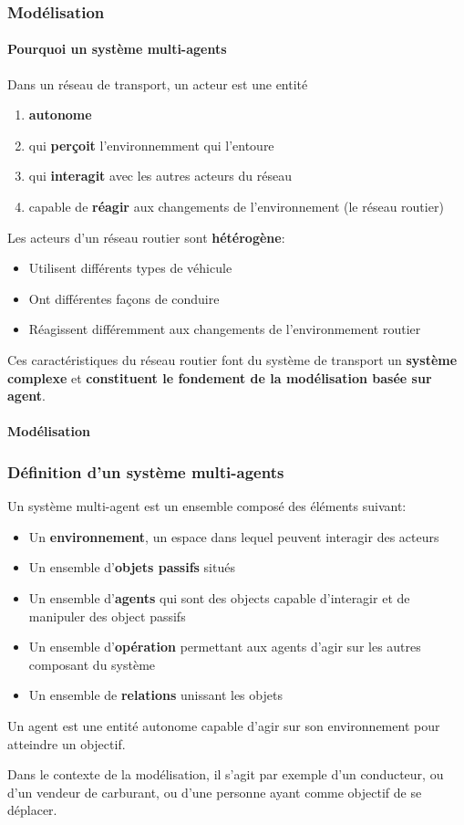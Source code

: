 \begin{frame}
    \frametitle{Modélisation}
    \framesubtitle{Pourquoi un système multi-agents}

    Dans un réseau de transport, un acteur est une entité
    \begin{enumerate}
        \item \textbf{autonome}
        \item qui \textbf{perçoit} l'environnemment qui l'entoure
        \item qui \textbf{interagit} avec les autres acteurs du réseau
        \item capable de \textbf{réagir} aux changements de l'environnement (le réseau routier)
    \end{enumerate}

    \pause{}
    Les acteurs d'un réseau routier sont \textbf{hétérogène}:

    \begin{itemize}
        \item Utilisent différents types de véhicule
        \item Ont différentes façons de conduire
        \item Réagissent différemment aux changements de l'environmement routier
    \end{itemize}

    \pause{}
    Ces caractéristiques du réseau routier font du système de transport un \textbf{système complexe} et \textbf{constituent le fondement de la modélisation basée sur agent}.
\end{frame}

\begin{frame}
    \framesubtitle{Modélisation}
    \frametitle{Définition d'un système multi-agents}
    Un système multi-agent est un ensemble composé des éléments suivant:
    \begin{itemize}
        \item Un \textbf{environnement}, un espace dans lequel peuvent interagir des acteurs
        \item Un ensemble d'\textbf{objets passifs} situés
        \item Un ensemble d'\textbf{agents} qui sont des objects capable d'interagir et de manipuler des object passifs
        \item Un ensemble d'\textbf{opération} permettant aux agents d'agir sur les autres composant du système
        \item Un ensemble de \textbf{relations} unissant les objets
    \end{itemize}

    \pause{}
    Un agent est une entité autonome capable d'agir sur son environnement pour atteindre un objectif.

    Dans le contexte de la modélisation, il s'agit par exemple d'un conducteur, ou d'un vendeur de carburant, ou d'une personne ayant comme objectif de se déplacer.
\end{frame}

